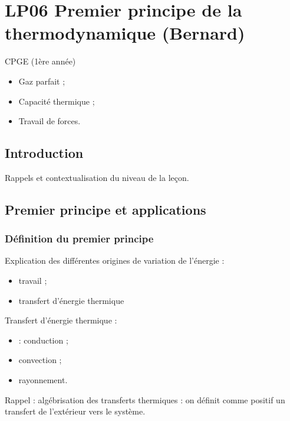 \section{LP06 Premier principe de la thermodynamique (Bernard)}

\niveau CPGE (1ère année)

\prerequis
\begin{itemize}
\item Gaz parfait ;
\item Capacité thermique ;
\item Travail de forces.
\end{itemize}

\objectif 

\footnotesize{}

\subsection{Introduction}

\begin{slide}
Rappels et contextualisation du niveau de la leçon.
\end{slide}

\subsection{Premier principe et applications}

\subsubsection{Définition du premier principe}

Explication des différentes origines de variation de l'énergie : 
\begin{itemize}
\item travail ;
\item transfert d'énergie thermique
\end{itemize}

\begin{slide}
Transfert d'énergie thermique :
\begin{itemize}
\item : conduction ;
\item convection ;
\item rayonnement.
\end{itemize}
\end{slide}

Rappel : algébrisation des transferts thermiques : on définit comme positif un transfert de l'extérieur vers le système.

